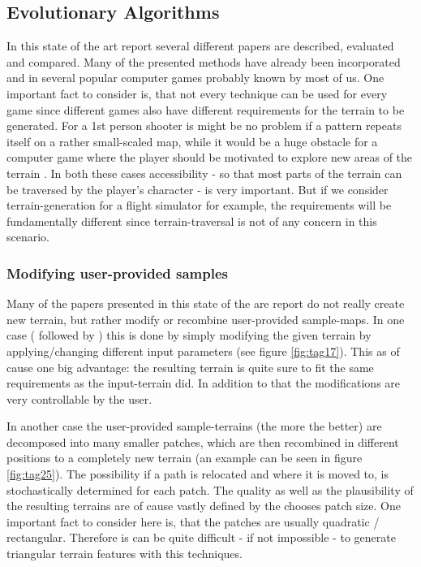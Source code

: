 \subsection{Evolutionary Algorithms}
In this state of the art report several different papers are described, evaluated and compared. Many of the presented methods have already been incorporated and in several popular computer games probably known by most of us. One important fact to consider is, that not every technique can be used for every game since different games also have different requirements for the terrain to be generated. For a 1st person shooter is might be no problem if a pattern repeats itself on a rather small-scaled map, while it would be a huge obstacle for a computer game where the player should be motivated to explore new areas of the terrain \cite{raffe2012survey}. In both these cases accessibility - so that most parts of the terrain can be traversed by the player's character - is very important. But if we consider terrain-generation for a flight simulator for example, the requirements will be fundamentally different since terrain-traversal is not of any concern in this scenario.

\subsubsection{Modifying user-provided samples}
Many of the papers presented in this state of the are report do not really create new terrain, but rather modify or recombine user-provided sample-maps. In one case (\cite{walsh2010terrain} followed by \cite{walsh2011use}) this is done by simply modifying the given terrain by applying/changing different input parameters (see figure \ref{fig:tag17}). This as of cause one big advantage: the resulting terrain is quite sure to fit the same requirements as the input-terrain did. In addition to that the modifications are very controllable by the user.

In another case \cite{raffe2011evolving} the user-provided sample-terrains (the more the better) are decomposed into many smaller patches, which are then recombined in different positions to a completely new terrain (an example can be seen in figure \ref{fig:tag25}). The possibility if a path is relocated and where it is moved to, is stochastically determined for each patch. The quality as well as the plausibility of the resulting terrains are of cause vastly defined by the chooses patch size. One important fact to consider here is, that the patches are usually quadratic / rectangular. Therefore is can be quite difficult - if not impossible - to generate triangular terrain features with this techniques.

